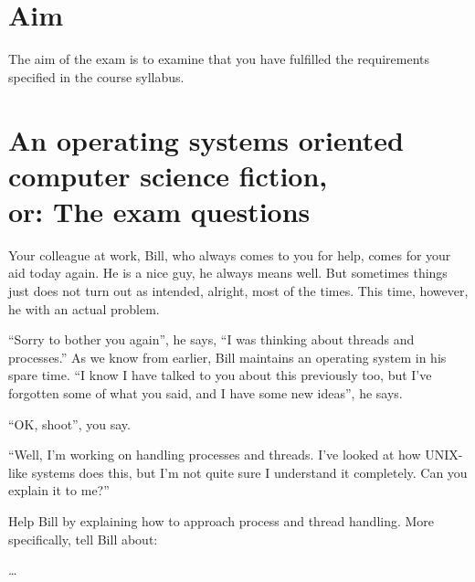 \documentclass[addpoints,svv]{miunexam}
\begin{document}
\section*{Aim}
\label{sec:Aim}
The aim of the exam is to examine that you have fulfilled the requirements 
specified in the course syllabus.

\clearpage
\section*{An operating systems oriented computer science fiction,\\
  or: The exam questions}

\begin{questions}
  \question[3]\label{q:threads}
  Your colleague at work, Bill, who always comes to you for help, comes for 
  your aid today again.
  He is a nice guy, he always means well.
  But sometimes things just does not turn out as intended, alright, most of the 
  times.
  This time, however, he with an actual problem.

  ``Sorry to bother you again'', he says, ``I was thinking about threads and 
  processes.''
  As we know from earlier, Bill maintains an operating system in his spare 
  time.
  ``I know I have talked to you about this previously too, but I've forgotten 
  some of what you said, and I have some new ideas'', he says.

  ``OK, shoot'', you say.

  ``Well, I'm working on handling processes and threads.
  I've looked at how UNIX-like systems does this, but I'm not quite sure 
  I understand it completely.  Can you explain it to me?''

  Help Bill by explaining how to approach process and thread handling.
  More specifically, tell Bill about:
  \begin{solution}
    \dots
  \end{solution}


\end{questions}
\end{document}
